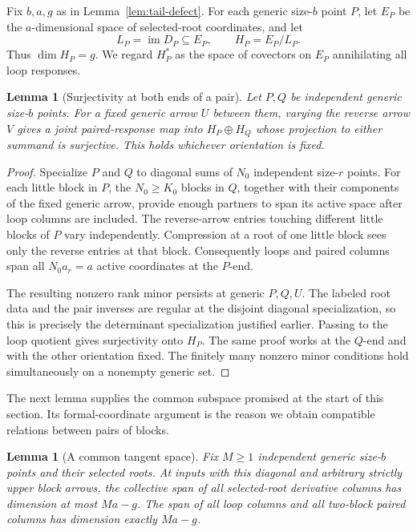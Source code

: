 \documentclass[11pt]{article}
\newtheorem{lemma}[theorem]{Lemma}
\theoremstyle{definition}
\theoremstyle{remark}
\numberwithin{equation}{section}
\begin{document}
Fix \(b,a,g\) as in Lemma~\ref{lem:tail-defect}. For each generic
size-\(b\) point \(P\), let \(E_P\) be the \(a\)-dimensional
space of selected-root coordinates, and let
\[
 L_P=\operatorname{im}D_P\subseteq E_P,
 \qquad H_P=E_P/L_P.
\]
Thus \(\dim H_P=g\). We regard \(H_P^*\) as the space of
covectors on \(E_P\) annihilating all loop responses.

\begin{lemma}[Surjectivity at both ends of a pair]
\label{lem:pair-quotient-surjectivity}
Let \(P,Q\) be independent generic size-\(b\) points. For a fixed
generic arrow \(U\) between them, varying the reverse arrow \(V\)
gives a joint paired-response map into \(H_P\oplus H_Q\) whose
projection to either summand is surjective. This holds whichever
orientation is fixed.
\end{lemma}

\begin{proof}
Specialize \(P\) and \(Q\) to diagonal sums of \(N_0\)
independent size-\(r\) points. For each little block in \(P\), the
\(N_0\geq K_0\) blocks in \(Q\), together with their components
of the fixed generic arrow, provide enough partners to span its
active space after loop columns are included. The reverse-arrow
entries touching different little blocks of \(P\) vary independently.
Compression at a root of one little block sees only the reverse
entries at that block. Consequently loops and paired columns span
all \(N_0a_r=a\) active coordinates at the \(P\)-end.

The resulting nonzero rank minor persists at generic \(P,Q,U\).
The labeled root data and the pair inverses are regular at the
disjoint diagonal specialization, so this is precisely the
determinant specialization justified earlier. Passing to the loop
quotient gives surjectivity onto \(H_P\). The same proof works at
the \(Q\)-end and with the other orientation fixed. The finitely
many nonzero minor conditions hold simultaneously on a nonempty
generic set.
\end{proof}

The next lemma supplies the common subspace promised at the start
of this section. Its formal-coordinate argument is the reason we
obtain compatible relations between pairs of blocks.

\begin{lemma}[A common tangent space]
\label{lem:common-tangent}
Fix \(M\geq1\) independent generic size-\(b\) points and their
selected roots. At inputs with this diagonal and arbitrary strictly
upper block arrows, the collective span of all selected-root
derivative columns has dimension at most \(Ma-g\). The span of
all loop columns and all two-block paired columns has dimension
exactly \(Ma-g\).
\end{lemma}
\end{document}
